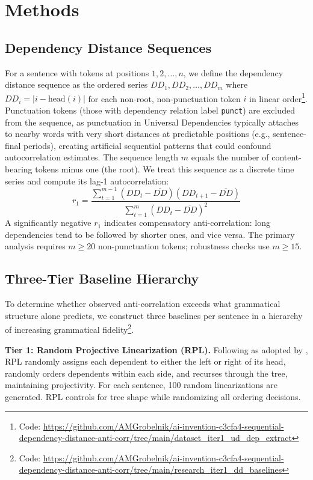 \documentclass[11pt,letterpaper]{article}
\begin{document}
\section{Methods}

\subsection{Dependency Distance Sequences}

For a sentence with tokens at positions $1, 2, \ldots, n$, we define the dependency distance sequence as the ordered series $DD_1, DD_2, \ldots, DD_m$ where $DD_i = |i - \text{head}(i)|$ for each non-root, non-punctuation token $i$ in linear order\footnote{Code: \url{https://github.com/AMGrobelnik/ai-invention-c3cfa4-sequential-dependency-distance-anti-corr/tree/main/dataset_iter1_ud_dep_extract}}. Punctuation tokens (those with dependency relation label \texttt{punct}) are excluded from the sequence, as punctuation in Universal Dependencies typically attaches to nearby words with very short distances at predictable positions (e.g., sentence-final periods), creating artificial sequential patterns that could confound autocorrelation estimates. The sequence length $m$ equals the number of content-bearing tokens minus one (the root). We treat this sequence as a discrete time series and compute its lag-1 autocorrelation:
\begin{equation}
r_1 = \frac{\sum_{t=1}^{m-1}(DD_t - \overline{DD})(DD_{t+1} - \overline{DD})}{\sum_{t=1}^{m}(DD_t - \overline{DD})^2}
\end{equation}
A significantly negative $r_1$ indicates compensatory anti-correlation: long dependencies tend to be followed by shorter ones, and vice versa. The primary analysis requires $m \geq 20$ non-punctuation tokens; robustness checks use $m \geq 15$.

\subsection{Three-Tier Baseline Hierarchy}

To determine whether observed anti-correlation exceeds what grammatical structure alone predicts, we construct three baselines per sentence in a hierarchy of increasing grammatical fidelity\footnote{Code: \url{https://github.com/AMGrobelnik/ai-invention-c3cfa4-sequential-dependency-distance-anti-corr/tree/main/research_iter1_dd_baselines}}.

\textbf{Tier 1: Random Projective Linearization (RPL).} Following \citet{Gildea2007, Gildea2010} as adopted by \citet{Futrell2015}, RPL randomly assigns each dependent to either the left or right of its head, randomly orders dependents within each side, and recurses through the tree, maintaining projectivity. For each sentence, 100 random linearizations are generated. RPL controls for tree shape while randomizing all ordering decisions.
\end{document}
